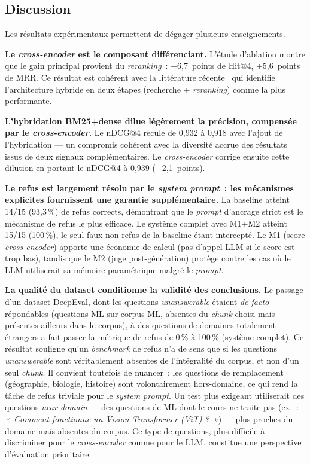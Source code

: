 \documentclass[11pt,a4paper]{article}
\begin{document}
\subsection{Discussion}
\label{sec:discussion}

Les résultats expérimentaux permettent de dégager plusieurs enseignements.

\textbf{Le \textit{cross-encoder} est le composant différenciant.} L'étude d'ablation montre que le gain principal provient du \textit{reranking}~: +6,7~points de Hit@4, +5,6~points de MRR. Ce résultat est cohérent avec la littérature récente~\cite{strich2026bm25,fensore2025liverag} qui identifie l'architecture hybride en deux étapes (recherche + \textit{reranking}) comme la plus performante.

\textbf{L'hybridation BM25+dense dilue légèrement la précision, compensée par le \textit{cross-encoder}.} Le nDCG@4 recule de 0,932 à 0,918 avec l'ajout de l'hybridation — un compromis cohérent avec la diversité accrue des résultats issus de deux signaux complémentaires. Le \textit{cross-encoder} corrige ensuite cette dilution en portant le nDCG@4 à 0,939 (+2,1~points).

\textbf{Le refus est largement résolu par le \textit{system prompt}~; les mécanismes explicites fournissent une garantie supplémentaire.} La baseline atteint 14/15 (93,3\,\%) de refus corrects, démontrant que le \textit{prompt} d'ancrage strict est le mécanisme de refus le plus efficace. Le système complet avec M1+M2 atteint 15/15 (100\,\%), le seul faux non-refus de la baseline étant intercepté. Le M1 (score \textit{cross-encoder}) apporte une économie de calcul (pas d'appel LLM si le score est trop bas), tandis que le M2 (juge post-génération) protège contre les cas où le LLM utiliserait sa mémoire paramétrique malgré le \textit{prompt}.

\textbf{La qualité du dataset conditionne la validité des conclusions.} Le passage d'un dataset DeepEval, dont les questions \textit{unanswerable} étaient \textit{de facto} répondables (questions ML sur corpus ML, absentes du \textit{chunk} choisi mais présentes ailleurs dans le corpus), à des questions de domaines totalement étrangers a fait passer la métrique de refus de 0\,\% à 100\,\% (système complet). Ce résultat souligne qu'un \textit{benchmark} de refus n'a de sens que si les questions \textit{unanswerable} sont véritablement absentes de l'intégralité du corpus, et non d'un seul \textit{chunk}. Il convient toutefois de nuancer~: les questions de remplacement (géographie, biologie, histoire) sont volontairement hors-domaine, ce qui rend la tâche de refus triviale pour le \textit{system prompt}. Un test plus exigeant utiliserait des questions \textit{near-domain} --- des questions de ML dont le cours ne traite pas (ex.~: \textit{«~Comment fonctionne un Vision Transformer (ViT) ?~»}) --- plus proches du domaine mais absentes du corpus. Ce type de questions, plus difficile à discriminer pour le \textit{cross-encoder} comme pour le LLM, constitue une perspective d'évaluation prioritaire.
\end{document}
